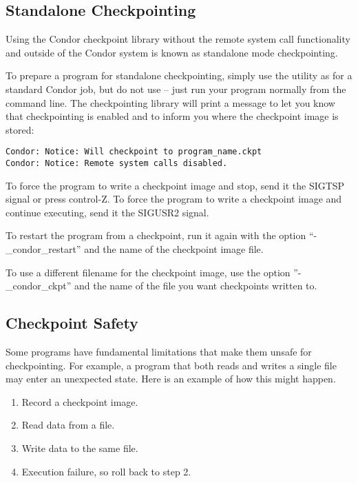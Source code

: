 \subsection{\label{sec:standalone-ckpt}Standalone Checkpointing}

Using the Condor checkpoint library without the remote system call
functionality and outside of the Condor system is known as standalone
mode checkpointing.

To prepare a program for standalone checkpointing, simply use the
 utility as for a standard Condor job, but do not
use  -- just run your program normally from the command
line.  The checkpointing library will print a message to let you know
that checkpointing is enabled and to inform you where the checkpoint
image is stored:

\begin{verbatim}
Condor: Notice: Will checkpoint to program_name.ckpt
Condor: Notice: Remote system calls disabled.
\end{verbatim}

To force the program to write a checkpoint image and stop, send it
the SIGTSP signal or press control-Z.  To force the program to 
write a checkpoint image and continue executing, send it the
SIGUSR2 signal.

To restart the program from a checkpoint, run it again with the
option ``-\_condor\_restart'' and the name of the checkpoint
image file.

To use a different filename for the checkpoint image, use the option
''-\_condor\_ckpt'' and the name of the file you want checkpoints
written to.

\subsection{\label{sec:ckpt-safety}Checkpoint Safety}

Some programs have fundamental limitations that make them
unsafe for checkpointing.  For example, a program that both reads
and writes a single file may enter an unexpected state. Here
is an example of how this might happen.

\begin{enumerate}
\item Record a checkpoint image.
\item Read data from a file.
\item Write data to the same file.
\item Execution failure, so roll back to step 2.
\end{enumerate}

